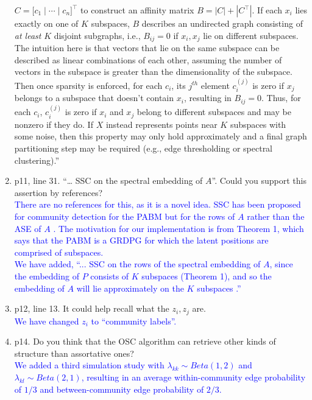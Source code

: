 \documentclass[
]{article}
\begin{document}
\begin{enumerate}
{  \(C = \bigl[ c_1 \mid \cdots \mid c_n \bigr]^\top\) to
  construct an affinity matrix \(B = |C| + |C^\top|\). If each \(x_i\) lies
  exactly on one of \(K\) subspaces, \(B\) describes an undirected graph
  consisting of {\em at least} \(K\) disjoint subgraphs, i.e., \(B_{ij} = 0\) if \(x_i, x_j\) lie on different subspaces. 
  The intuition here is that vectors that lie on the same subspace can be described as linear combinations of each other, assuming the number of vectors in the subspace is greater than the dimensionality of the subspace. 
  Then once sparsity is enforced, for each $c_i$, its $j^{th}$ element $c_i^{(j)}$ is zero if $x_j$ belongs to a subspace that doesn't contain $x_i$, resulting in $B_{ij} = 0$. 
  Thus, for each $c_i$, $c_i^{(j)}$ is zero if $x_i$ and $x_j$ belong to different subspaces and may be nonzero if they do. 
  If \(X\) instead represents points near \(K\) subspaces with some noise, 
  then this property may only hold approximately and 
  a final graph partitioning step may be required 
  (e.g., edge thresholding or spectral clustering).''
  }
\item
  p11, line 31. ``\ldots{} SSC on the spectral embedding of \(A\)''.
  Could you support this assertion by references?\\
  \textcolor{blue}{
  There are no references for this, as it is a novel idea. 
  SSC has been proposed for community detection for the PABM but for the rows of $A$ rather than the ASE of $A$ \citep{noroozi2019estimation}. 
  The motivation for our implementation is from Theorem 1, which says that the PABM is a GRDPG for which the latent positions are comprised of subspaces. 
  }\\
  \textcolor{blue}{
  We have added, ``... SSC on the rows of the spectral embedding of $A$, since the embedding of $P$ consists of $K$ subspaces (Theorem 1), and so the embedding of $A$ will lie approximately on the $K$ subspaces \citep{rubindelanchy2017statistical}.''
  }
\item
  p12, line 13. It could help recall what the \(z_i, z_j\) are.\\
  \textcolor{blue}{
  We have changed $z_i$ to ``community labels''.
  }
\item
  p14. Do you think that the OSC algorithm can retrieve other kinds of
  structure than assortative ones?\\
  \textcolor{blue}{
  We added a third simulation study with $\lambda_{kk} \sim Beta(1,2)$ and $\lambda_{kl} \sim Beta(2,1)$, resulting in an average within-community edge probability of $1/3$ and between-community edge probability of $2/3$. 
}
\end{enumerate}
\end{document}
